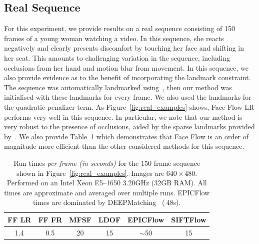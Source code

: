 \subsection{Real Sequence}\label{subsec:face_flow_experiments_real}
For this experiment, we provide results on a real sequence consisting
of 150 frames of a young woman watching a video. In this sequence, she reacts
negatively and clearly presents discomfort by touching her face and shifting
in her seat. This amounts to challenging variation in the sequence, including
occlusions from her hand and motion blur from movement. In this sequence,
we also provide evidence as to the benefit of incorporating the landmark constraint. The sequence was
automatically landmarked using~\cite{kazemi2014one}, then our method was initialised with
these landmarks for every frame. We also used the landmarks for the quadratic penalizer term.
As Figure~\ref{fig:real_examples} shows, Face Flow LR performs very well in this sequence. In particular,
we note that our method is very robust to the presence of occlusions, aided by the sparse
landmarks provided by~\cite{kazemi2014one}. We also provide Table~\ref{tbl:run_times}
which demonstrates that Face Flow is an order of magnitude more efficient than
the other considered methods for this sequence.
\begin{table}[t]
    \centering
    \begin{tabular}{cccccc}
                                                     \toprule
FF LR & FF FR & MFSF & LDOF & EPICFlow & SIFTFlow \\ \toprule
1.4   & 0.5   & 20   & 15   & $\sim$50 & 15       \\ \bottomrule
    \end{tabular}
    \caption{Run times \textit{per frame (in seconds)} for the 150 frame
             sequence shown in Figure~\ref{fig:real_examples}. Images are
             $640\times480$. Performed on an Intel Xeon E5--1650 3.20GHz
             (32GB RAM). All times are approximate and averaged over multiple
             runs. EPICFlow times are dominated by
             DEEPMatching~\cite{weinzaepfel2013deepflow} ($~48$s).}
\label{tbl:run_times}
\end{table}

